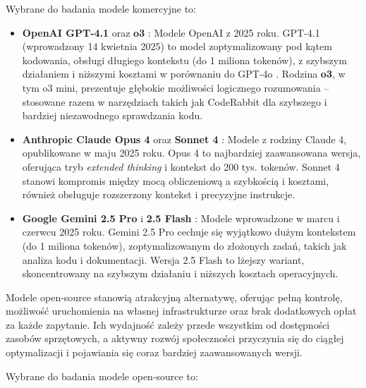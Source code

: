 Wybrane do badania modele komercyjne to:

\begin{itemize}
    \item \textbf{OpenAI GPT‑4.1} \cite{gpt41} oraz \textbf{o3} \cite{o3}: Modele OpenAI z 2025 roku. GPT‑4.1 (wprowadzony 14 kwietnia 2025) to model zoptymalizowany pod kątem kodowania, obsługi długiego kontekstu (do 1 miliona tokenów), z szybszym działaniem i niższymi kosztami w porównaniu do GPT‑4o . Rodzina \textbf{o3}, w tym o3 mini, prezentuje głębokie możliwości logicznego rozumowania – stosowane razem w narzędziach takich jak CodeRabbit dla szybszego i bardziej niezawodnego sprawdzania kodu.
    
    \item \textbf{Anthropic Claude Opus 4} \cite{claude_opus4} oraz \textbf{Sonnet 4} \cite{claude_sonnet4}: Modele z rodziny Claude 4, opublikowane w maju 2025 roku. Opus 4 to najbardziej zaawansowana wersja, oferująca tryb \textit{extended thinking} i kontekst do 200 tys. tokenów. Sonnet 4 stanowi kompromis między mocą obliczeniową a szybkością i kosztami, również obsługuje rozszerzony kontekst i precyzyjne instrukcje.

    \item \textbf{Google Gemini 2.5 Pro} \cite{gemini25_pro} i \textbf{2.5 Flash} \cite{gemini25_flash}: Modele wprowadzone w marcu i czerwcu 2025 roku. Gemini 2.5 Pro cechuje się wyjątkowo dużym kontekstem (do 1 miliona tokenów), zoptymalizowanym do złożonych zadań, takich jak analiza kodu i dokumentacji. Wersja 2.5 Flash to lżejszy wariant, skoncentrowany na szybszym działaniu i niższych kosztach operacyjnych.
\end{itemize}

Modele open-source stanowią atrakcyjną alternatywę, oferując pełną kontrolę, możliwość uruchomienia na własnej infrastrukturze oraz brak dodatkowych opłat za każde zapytanie. Ich wydajność zależy przede wszystkim od dostępności zasobów sprzętowych, a aktywny rozwój społeczności przyczynia się do ciągłej optymalizacji i pojawiania się coraz bardziej zaawansowanych wersji.

Wybrane do badania modele open-source to:

